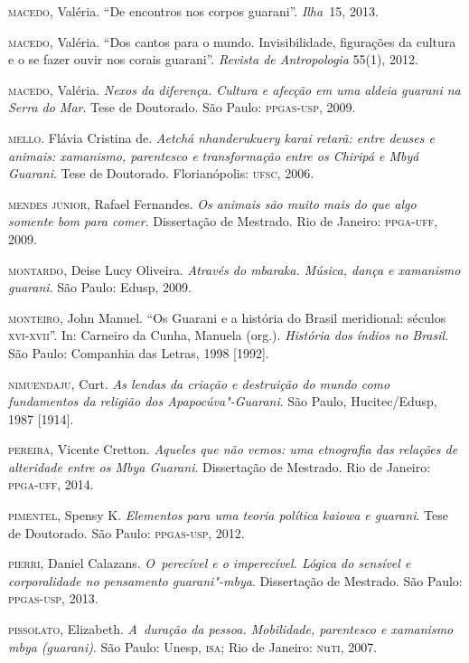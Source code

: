 \begin{Parskip}
\textsc{macedo}, Valéria. ``De encontros nos corpos guarani''. \emph{Ilha~}15, 2013.

\textsc{macedo}, Valéria. ``Dos cantos para o mundo. Invisibilidade, figurações da
cultura e o se fazer ouvir nos corais guarani''. \emph{Revista de Antropologia}
55(1), 2012.

\textsc{macedo}, Valéria. \emph{Nexos da diferença. Cultura e afecção em uma aldeia
guarani na Serra do Mar}. Tese de Doutorado. São Paulo: \textsc{ppgas}-\textsc{usp}, 2009.

\textsc{mello}. Flávia Cristina de. \emph{Aetchá nhanderukuery karai retarã: entre
deuses e animais: xamanismo, parentesco e transformação entre os
Chiripá e Mbyá Guarani}. Tese de Doutorado. Florianópolis: \textsc{ufsc}, 2006.

\textsc{mendes} \textsc{júnior}, Rafael Fernandes. \emph{Os animais são muito mais do que algo
somente bom para comer}. Dissertação de Mestrado. Rio de Janeiro:
\textsc{ppga}-\textsc{uff}, 2009.

\textsc{montardo}, Deise Lucy Oliveira. \emph{Através do mbaraka. Música, dança e
xamanismo guarani}. São Paulo: Edusp, 2009.

\textsc{monteiro}, John Manuel. ``Os Guarani e a história do Brasil meridional:
séculos \textsc{xvi}-\textsc{xvii}''. In: Carneiro da Cunha, Manuela (org.). \emph{História dos
índios no Brasil}. São Paulo: Companhia das Letras, 1998 [1992].

\textsc{nimuendaju}, Curt. \emph{As lendas da criação e destruição do mundo como
fundamentos da religião dos Apapocúva"-Guarani}. São Paulo,
Hucitec/Edusp, 1987 [1914].

\textsc{pereira}, Vicente Cretton. \emph{Aqueles que não vemos: uma etnografia das
relações de alteridade entre os Mbya Guarani}. Dissertação de Mestrado.
Rio de Janeiro: \textsc{ppga}-\textsc{uff}, 2014.

\textsc{pimentel}, Spensy K. \emph{Elementos para uma teoria política kaiowa e guarani}.
Tese de Doutorado. São Paulo: \textsc{ppgas}-\textsc{usp}, 2012.

\textsc{pierri}, Daniel Calazans. \emph{O~perecível e o imperecível. Lógica do sensível
e corporalidade no pensamento guarani"-mbya}. Dissertação de Mestrado.
São Paulo: \textsc{ppgas}-\textsc{usp}, 2013.

\textsc{pissolato}, Elizabeth. \emph{A~duração da pessoa. Mobilidade, parentesco e
xamanismo mbya (guarani)}. São Paulo: Unesp, \textsc{isa}; Rio de Janeiro: \textsc{n}u\textsc{ti},
2007.


\end{Parskip}
